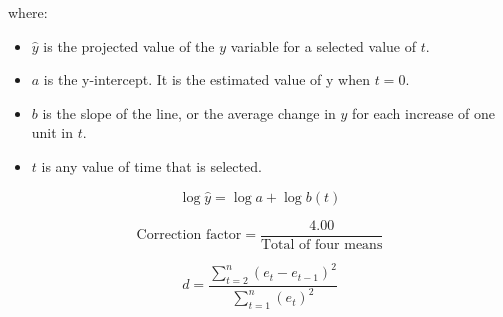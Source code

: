 where:
\begin{itemize}
 \item $\hat{y}$ is the projected value of the $y$ variable for a selected value of $t$.
 \item $a$ is the y-intercept. It is the estimated value of y when $t = 0$.
 \item $b$ is the slope of the line, or the average change in $\hat{y}$ for each increase of one unit in $t$.
 \item $t$ is any value of time that is selected.
\end{itemize}
\hformbar


\begin{equation}
\label{log trend equation}
\log \hat{y} = \log a + \log b(t)
\end{equation}
\hformbar


\begin{equation}
\label{correction factor adjusting quarterly means}
\text{Correction factor} = \frac{4.00}{\text{Total of four means}}
\end{equation}
\hformbar


\begin{equation}
\label{durbin-watson statistic}
d = \frac{\sum_{t = 2}^{n} (e_t - e_{t-1})^2}{\sum_{t = 1}^n(e_t)^2}  
\end{equation}
\hformbar